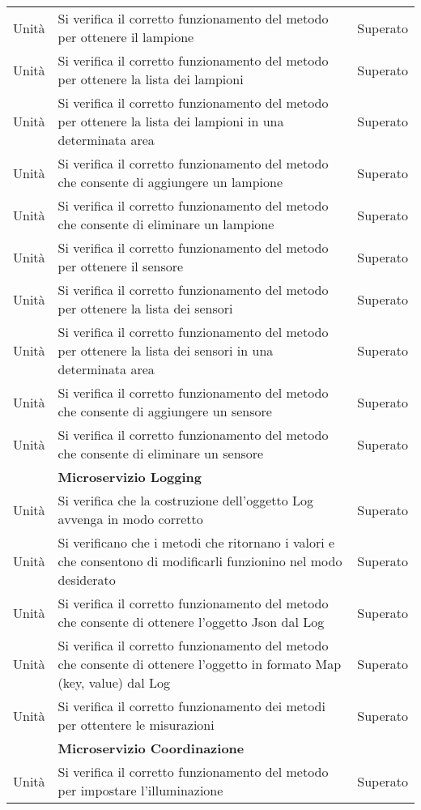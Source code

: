 \begin{center}
\begin{xltabular}{\linewidth}{|l|X|l|}
        Unità & Si verifica il corretto funzionamento del metodo per ottenere il lampione & Superato\\
        Unità & Si verifica il corretto funzionamento del metodo per ottenere la lista dei lampioni & Superato\\
        Unità & Si verifica il corretto funzionamento del metodo per ottenere la lista dei lampioni in una determinata area & Superato\\
        Unità & Si verifica il corretto funzionamento del metodo che consente di aggiungere un lampione & Superato\\
        Unità & Si verifica il corretto funzionamento del metodo che consente di eliminare un lampione & Superato\\
        Unità & Si verifica il corretto funzionamento del metodo per ottenere il sensore & Superato\\
        Unità & Si verifica il corretto funzionamento del metodo per ottenere la lista dei sensori & Superato\\
        Unità & Si verifica il corretto funzionamento del metodo per ottenere la lista dei sensori in una determinata area & Superato\\
        Unità & Si verifica il corretto funzionamento del metodo che consente di aggiungere un sensore & Superato\\
        Unità & Si verifica il corretto funzionamento del metodo che consente di eliminare un sensore & Superato\\
        & \textbf{Microservizio Logging} &\\
        Unità & Si verifica che la costruzione dell'oggetto Log avvenga in modo corretto & Superato\\
        Unità & Si verificano che i metodi che ritornano i valori e che consentono di modificarli funzionino nel modo desiderato & Superato\\
        Unità & Si verifica il corretto funzionamento del metodo che consente di ottenere l'oggetto Json dal Log & Superato\\
        Unità & Si verifica il corretto funzionamento del metodo che consente di ottenere l'oggetto in formato Map (key, value) dal Log & Superato\\
        Unità & Si verifica il corretto funzionamento dei metodi per ottentere le misurazioni & Superato\\
        & \textbf{Microservizio Coordinazione} &\\
        Unità & Si verifica il corretto funzionamento del metodo per impostare l'illuminazione & Superato\\

\end{xltabular}
\end{center}
